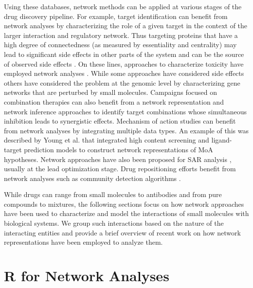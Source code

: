 \documentclass[]{book}
\begin{document}
Using these databases, network methods can be applied at various
stages of the drug discovery pipeline. For example, target
identification can benefit from network analyses by characterizing the
role of a given target in the context of the larger interaction and
regulatory network. Thus targeting proteins that have a high degree of
connectedness (as measured by essentiality and centrality) may lead to
significant side effects in other parts of the system and can be the
source of observed side effects \cite{Wang:2013gn}. On these lines,
approaches to characterize toxicity have employed network analyses
\cite{Kim:2014xs,Zhang:2014hj}. While some approaches have considered
side effects \cite{Lounkine:2012yf} others have considered the problem
at the genomic level by characterizing gene networks that are
perturbed by small molecules. Campaigns focused on combination
therapies can also benefit from a network representation and network
inference approaches \cite{Huang:2014by,Tang:2013lr} to identify
target combinations whose simultaneous inhibition leads to synergistic
effects. Mechanism of action studies can benefit from network analyses
by integrating multiple data types. An example of this was described
by Young et al. \cite{Young:2008aa} that integrated high content
screening and ligand-target prediction models to construct network
representations of MoA hypotheses. Network approaches have also been
proposed for SAR analysis \cite{Iyer:2011ij,Wawer:2008aa}, usually at
the lead optimization stage. Drug repositioning efforts
\cite{Dudley:2011dn,Gottlieb:2011rx} benefit from network analyses
such as community detection algorithms \cite{girvan2002community}.

While drugs can range from small molecules to antibodies and from pure
compounds to mixtures, the following sections focus on how network
approaches have been used to characterize and model the interactions
of small molecules with biological systems. We group such interactions
based on the nature of the interacting entities and provide a brief
overview of recent work on how network representations have been
employed to analyze them. 

\section{R for Network Analyses}
\label{sec:r-network-analyses}
\end{document}
